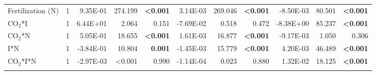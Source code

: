 \begin{landscape}
\begin{table}
{\begin{tabular}{p{3cm}p{0.5cm}p{1.75cm}p{1.5cm}p{1.5cm}p{1.75cm}p{1.5cm}p{1.5cm}p{1.75cm}p{1.5cm}p{1.5cm}}
            Fertilization (N) & \multicolumn{1}{r}{1}
            & \multicolumn{1}{r}{9.35E-01}      & \multicolumn{1}{r}{274.199}       & \multicolumn{1}{r}{\textbf{<0.001}}
            & \multicolumn{1}{r}{3.14E-03}      & \multicolumn{1}{r}{269.046}       & \multicolumn{1}{r}{\textbf{<0.001}}
            & \multicolumn{1}{r}{-8.50E-03}     & \multicolumn{1}{r}{80.501}        & \multicolumn{1}{r}{\textbf{<0.001}} 
            \\

            CO$_2$*I & \multicolumn{1}{r}{1}
            & \multicolumn{1}{r}{6.44E+01}      & \multicolumn{1}{r}{2.064}         & \multicolumn{1}{r}{0.151}
            & \multicolumn{1}{r}{-7.69E-02}     & \multicolumn{1}{r}{0.518}         & \multicolumn{1}{r}{0.472}
            & \multicolumn{1}{r}{-8.38E+00}     & \multicolumn{1}{r}{85.237}        & \multicolumn{1}{r}{\textbf{<0.001}} 
            \\

            CO$_2$*N & \multicolumn{1}{r}{1}
            & \multicolumn{1}{r}{5.05E-01}      & \multicolumn{1}{r}{18.655}        & \multicolumn{1}{r}{\textbf{<0.001}}
            & \multicolumn{1}{r}{1.61E-03}      & \multicolumn{1}{r}{16.877}        & \multicolumn{1}{r}{\textbf{<0.001}}
            & \multicolumn{1}{r}{-9.17E-03}     & \multicolumn{1}{r}{1.050}         & \multicolumn{1}{r}{0.306} 
            \\

            I*N & \multicolumn{1}{r}{1}
            & \multicolumn{1}{r}{-3.84E-01}     & \multicolumn{1}{r}{10.804}        & \multicolumn{1}{r}{\textbf{0.001}}
            & \multicolumn{1}{r}{-1.45E-03}     & \multicolumn{1}{r}{15.779}        & \multicolumn{1}{r}{\textbf{<0.001}}
            & \multicolumn{1}{r}{4.20E-03}      & \multicolumn{1}{r}{46.489}        & \multicolumn{1}{r}{\textbf{<0.001}} 
            \\

            CO$_2$*I*N & \multicolumn{1}{r}{1}
            & \multicolumn{1}{r}{-2.97E-03}     & \multicolumn{1}{r}{<0.001}        & \multicolumn{1}{r}{0.990}
            & \multicolumn{1}{r}{-1.14E-04}     & \multicolumn{1}{r}{0.023}         & \multicolumn{1}{r}{0.880}
            & \multicolumn{1}{r}{1.32E-02}      & \multicolumn{1}{r}{18.125}        & \multicolumn{1}{r}{\textbf{<0.001}} 
            \\
            \hline

            &&&&&&&&&&
            \\


\end{tabular}}
\end{table}
\end{landscape}
